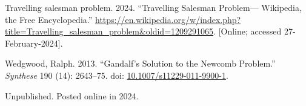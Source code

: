 \documentclass[
  10pt,
  letterpaper,
  DIV=11,
  numbers=noendperiod,
  twoside]{scrartcl}
\newlength{\cslhangindent}
\newenvironment{CSLReferences}[2] %
 {\begin{list}{}{%
  \setlength{\itemindent}{0pt}
  \setlength{\leftmargin}{0pt}
  \setlength{\parsep}{0pt}
  \ifodd #1
   \setlength{\leftmargin}{\cslhangindent}
   \setlength{\itemindent}{-1\cslhangindent}
  \fi
  \setlength{\itemsep}{#2\baselineskip}}}
 {\end{list}}
\begin{document}
\begin{CSLReferences}{1}{0}
Travelling salesman problem. 2024. {``Travelling Salesman Problem---
{W}ikipedia{,} the Free Encyclopedia.''}
\url{https://en.wikipedia.org/w/index.php?title=Travelling_salesman_problem&oldid=1209291065}.
{[}Online; accessed 27-February-2024{]}.

Wedgwood, Ralph. 2013. {``Gandalf's Solution to the Newcomb Problem.''}
\emph{Synthese} 190 (14): 2643--75. doi:
\href{https://doi.org/10.1007/s11229-011-9900-1}{10.1007/s11229-011-9900-1}.

\end{CSLReferences}



\noindent Unpublished. Posted online in 2024.
\end{document}
